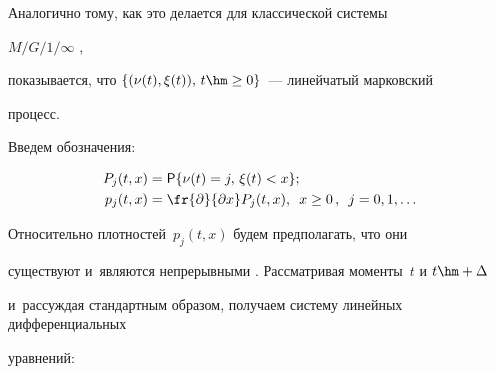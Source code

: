 Аналогично тому, как это делается для классической сис\-те\-мы

$M/G/1/\infty$ \cite[с.~289]{bo1},

показывается, что ${\{(\nu(t),\xi(t)),\,t\hm\geq 0\}}$~--- линейчатый марковский 

процесс.



Введем обозначения:



\vspace*{-2pt}



\noindent

\begin{align*}

P_j(t,x)&=\mathsf{P}\{\nu(t)=j,\,\xi(t)<x\};

\\

p_j(t,x)&=\fr{\partial}{\partial x} P_j(t,x),

\enskip x \ge 0\,, \enskip j =0,1,\dots

\end{align*}



\vspace*{-2pt}



\noindent

Относительно плотностей~$p_j(t,x)$ будем предполагать, что они 

существуют и~являются непрерывными \cite[гл. 5]{bo1}. Рассматривая моменты~$t$ и $t\hm+\Delta$

и~рассуждая стандартным образом, получаем сис\-те\-му линейных дифференциальных 

уравнений:



\vspace*{-2pt}



\noindent

